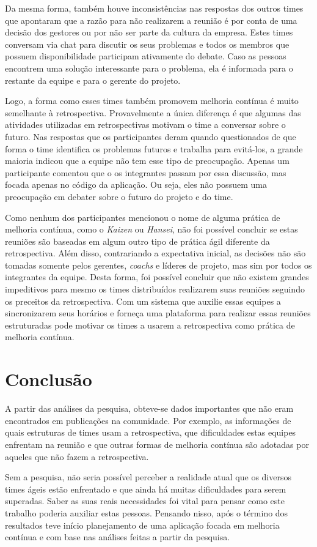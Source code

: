 Da mesma forma, também houve inconsistências nas respostas dos outros times que apontaram que a razão para não realizarem a reunião é por conta de uma decisão dos gestores ou por não ser parte da cultura da empresa. Estes times conversam via chat para discutir os seus problemas e todos os membros que possuem disponibilidade participam ativamente do debate. Caso as pessoas encontrem uma solução interessante para o problema, ela é informada para o restante da equipe e para o gerente do projeto. 

Logo, a forma como esses times também promovem melhoria contínua é muito semelhante à retrospectiva. Provavelmente a única diferença é que algumas das atividades utilizadas em retrospectivas motivam o time a conversar sobre o futuro. Nas respostas que os participantes deram quando questionados de que forma o time identifica os problemas futuros e trabalha para evitá-los, a grande maioria indicou que a equipe não tem esse tipo de preocupação. Apenas um participante comentou que o os integrantes passam por essa discussão, mas focada apenas no código da aplicação. Ou seja, eles não possuem uma preocupação em debater sobre o futuro do projeto e do time.

Como nenhum dos participantes mencionou o nome de alguma prática de melhoria contínua, como o \textit{Kaizen} ou \textit{Hansei}, não foi possível concluir se estas reuniões são baseadas em algum outro tipo de prática ágil diferente da retrospectiva. Além disso, contrariando a expectativa inicial, as decisões não são tomadas somente pelos gerentes, \textit{coachs} e líderes de projeto, mas sim por todos os integrantes da equipe. Desta forma, foi possível concluir que não existem grandes impeditivos para mesmo os times distribuídos realizarem suas reuniões seguindo os preceitos da retrospectiva. Com um sistema que auxilie essas equipes a sincronizarem seus horários e forneça uma plataforma para realizar essas reuniões estruturadas pode motivar os times a usarem a retrospectiva como prática de melhoria contínua.

\section{Conclusão}

A partir das análises da pesquisa, obteve-se dados importantes que não eram encontrados em publicações na comunidade. Por exemplo, as informações de quais estruturas de times usam a retrospectiva, que dificuldades estas equipes enfrentam na reunião e que outras formas de melhoria contínua são adotadas por aqueles que não fazem a retrospectiva.

Sem a pesquisa, não seria possível perceber a realidade atual que os diversos times ágeis estão enfrentado e que ainda há muitas dificuldades para serem superadas. Saber as suas reais necessidades foi vital para pensar como este trabalho poderia auxiliar estas pessoas. Pensando nisso, após o término dos resultados teve início planejamento de uma aplicação focada em melhoria contínua e com base nas análises feitas a partir da pesquisa.